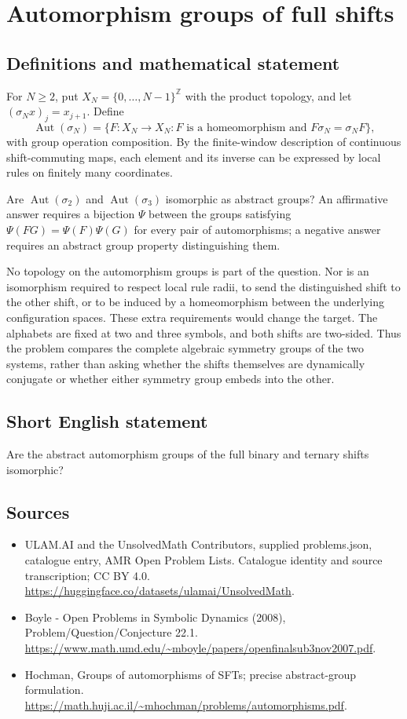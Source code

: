 \documentclass[11pt,a4paper]{article}
\begin{document}
\section*{Automorphism groups of full shifts}\label{statement}

\subsection{Definitions and mathematical statement}
For $N\ge2$, put $X_N=\{0,\ldots,N-1\}^{\mathbb Z}$ with the
product topology, and let $(\sigma_Nx)_j=x_{j+1}$. Define
\[
 \operatorname{Aut}(\sigma_N)=
 \{F:X_N\to X_N:F\text{ is a homeomorphism and }
                         F\sigma_N=\sigma_NF\},
\]
with group operation composition. By the finite-window description
of continuous shift-commuting maps, each element and its inverse
can be expressed by local rules on finitely many coordinates.

Are $\operatorname{Aut}(\sigma_2)$ and
$\operatorname{Aut}(\sigma_3)$ isomorphic as abstract groups?
An affirmative answer requires a bijection $\Psi$ between the
groups satisfying $\Psi(FG)=\Psi(F)\Psi(G)$ for every pair of
automorphisms; a negative answer requires an abstract group
property distinguishing them.

No topology on the automorphism groups is part of the question.
Nor is an isomorphism required to respect local rule radii, to
send the distinguished shift to the other shift, or to be induced
by a homeomorphism between the underlying configuration spaces.
These extra requirements would change the target. The alphabets
are fixed at two and three symbols, and both shifts are two-sided.
Thus the problem compares the complete algebraic symmetry groups
of the two systems, rather than asking whether the shifts
themselves are dynamically conjugate or whether either symmetry
group embeds into the other.
\subsection{Short English statement}
Are the abstract automorphism groups of the full binary and ternary shifts isomorphic?
\subsection{Sources}
\begin{itemize}
\item[S1] ULAM.AI and the UnsolvedMath Contributors, supplied problems.json, catalogue entry, AMR Open Problem Lists. Catalogue identity and source transcription; CC BY 4.0.
\url{https://huggingface.co/datasets/ulamai/UnsolvedMath}.
\item[S2] Boyle - Open Problems in Symbolic Dynamics (2008), Problem/Question/Conjecture 22.1. 
\url{https://www.math.umd.edu/~mboyle/papers/openfinalsub3nov2007.pdf}.
\item[S3] Hochman, Groups of automorphisms of SFTs; precise abstract-group formulation.
\url{https://math.huji.ac.il/~mhochman/problems/automorphisms.pdf}.
\end{itemize}
\end{document}
